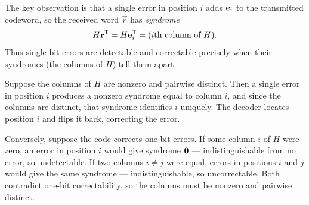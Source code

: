 \begin{prf}
The key observation is that a single error in position $i$ adds $\mathbf{e}_i$ to the transmitted codeword, so the received word $\vec{r}$ has \emph{syndrome}
\[
H\mathbf{r}^{\mathsf{T}}=H\mathbf{e}_i^{\mathsf{T}}=(\text{$i$th column of }H).
\]
Thus single-bit errors are detectable and correctable precisely when their syndromes (the columns of $H$) tell them apart.

\case{($\Leftarrow$)} Suppose the columns of $H$ are nonzero and pairwise distinct. Then a single error in position $i$ produces a nonzero syndrome equal to column $i$, and since the columns are distinct, that syndrome identifies $i$ uniquely. The decoder locates position $i$ and flips it back, correcting the error.

\case{($\Rightarrow$)} Conversely, suppose the code corrects one-bit errors. If some column $i$ of $H$ were zero, an error in position $i$ would give syndrome $\mathbf{0}$ --- indistinguishable from no error, so undetectable. If two columns $i\neq j$ were equal, errors in positions $i$ and $j$ would give the same syndrome --- indistinguishable, so uncorrectable. Both contradict one-bit correctability, so the columns must be nonzero and pairwise distinct.
\end{prf}

